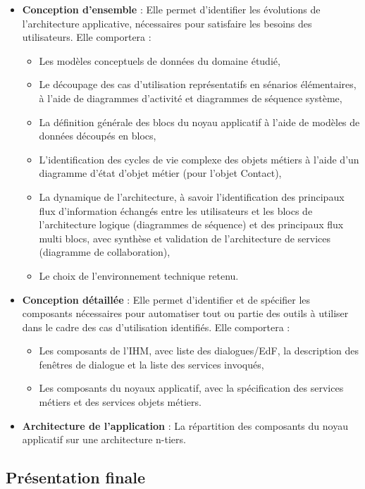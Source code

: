 \begin{itemize}
\item \textbf{Conception d'ensemble} : Elle permet d'identifier les évolutions de l'architecture applicative, nécessaires pour satisfaire les besoins des utilisateurs. Elle comportera :

\begin{itemize}
\item Les modèles conceptuels de données du domaine étudié,
\item Le découpage des cas d'utilisation représentatifs en sénarios élémentaires, à l'aide de diagrammes d'activité et diagrammes de séquence système,
\item La définition générale des blocs du noyau applicatif à l'aide de modèles de données découpés en blocs,
\item L'identification des cycles de vie complexe des objets métiers à l'aide d'un diagramme d'état d'objet métier (pour l'objet Contact),
\item La dynamique de l'architecture, à savoir l'identification des principaux flux d'information échangés entre les utilisateurs et les blocs de l'architecture logique (diagrammes de séquence) et des principaux flux multi blocs, avec synthèse et validation de l'architecture de services (diagramme de collaboration),
\item Le choix de l'environnement technique retenu.
\end{itemize}

\item \textbf{Conception détaillée} : Elle permet d'identifier et de spécifier les composants nécessaires pour automatiser tout ou partie des outils à utiliser dans le cadre des cas d'utilisation identifiés. Elle comportera :

\begin{itemize}
\item Les composants de l'IHM, avec liste des dialogues/EdF, la description des fenêtres de dialogue et la liste des services invoqués,
\item Les composants du noyaux applicatif, avec la spécification des services métiers et des services objets métiers.
\end{itemize}

\item \textbf{Architecture de l'application} : La répartition des composants du noyau applicatif sur une architecture n-tiers.
\end{itemize}

\subsection{Présentation finale}

